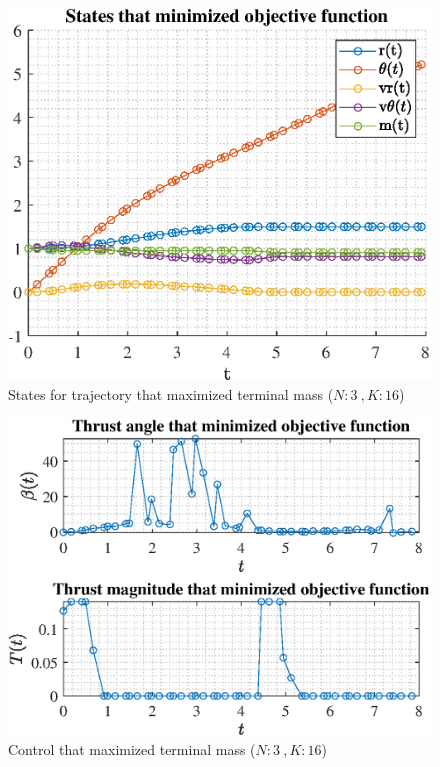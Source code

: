 \documentclass[]{article}
\begin{document}
\begin{figure}
	\centering
	\includegraphics[scale=0.75]{states_N3_K16_C3_mf.eps}
	\caption{States for trajectory that maximized terminal mass (\(N:3\ , K:16\))}
	\label{fig:states_N3_K16_C3_mf}
\end{figure}
\begin{figure}
	\centering
	\includegraphics[scale=0.75]{control_N3_K16_C3_mf.eps}
	\caption{Control that maximized terminal mass (\(N:3\ , K:16\))}
	\label{fig:control_N3_K16_C3_mf}
\end{figure}
\end{document}
